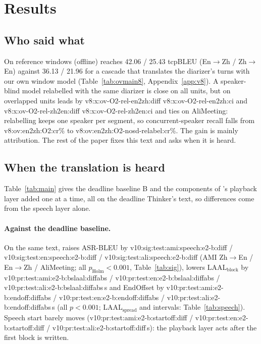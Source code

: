 \section{Results}
\label{sec:results}

\subsection{Who said what}
\label{sec:res-offline}
\label{sec:res-overlap}

On reference windows \sys{} (offline) reaches 42.06 / 25.43 tcpBLEU (En$\rightarrow$Zh / Zh$\rightarrow$En) against
36.13 / 21.96 for a cascade that translates the diarizer's turns with our own window model (Table~\ref{tab:ovmain8},
Appendix~\ref{app:v8}). A speaker-blind model relabelled with the same diarizer is close on all units, but on
overlapped units \sys{} leads by \num{v8:x:ov-O2-rel-en2zh:diff} \num{v8:x:ov-O2-rel-en2zh:ci} and
\num{v8:x:ov-O2-rel-zh2en:diff} \num{v8:x:ov-O2-rel-zh2en:ci} and ties on AliMeeting: relabelling keeps one speaker
per segment, so concurrent-speaker recall falls from \num{v8:ov:en2zh:O2:cr}\% to
\num{v8:ov:en2zh:O2-nosd-relabel:cr}\%. The gain is mainly attribution. The rest of the paper fixes this text and asks
when it is heard.

\subsection{When the translation is heard}
\label{sec:res-pa}
\label{sec:res-v10}

Table~\ref{tab:main} gives the deadline baseline B and the components of \sys{}'s playback layer added one at a time,
all on the deadline Thinker's text, so differences come from the speech layer alone.

\paragraph{Against the deadline baseline.} On the same text, \sys{} raises ASR-BLEU by
\num{v10:sig:test:ami:speech:e2-b:diff} / \num{v10:sig:test:en:speech:e2-b:diff} /
\num{v10:sig:test:ali:speech:e2-b:diff} (AMI Zh$\rightarrow$En / En$\rightarrow$Zh / AliMeeting; all
$p_\text{Holm}<0.001$, Table~\ref{tab:sig}), lowers LAAL$_\text{block}$ by
\num{v10:pr:test:ami:e2-b:bslaal:diffabs} / \num{v10:pr:test:en:e2-b:bslaal:diffabs} /
\num{v10:pr:test:ali:e2-b:bslaal:diffabs}\,s and EndOffset by \num{v10:pr:test:ami:e2-b:endoff:diffabs} /
\num{v10:pr:test:en:e2-b:endoff:diffabs} / \num{v10:pr:test:ali:e2-b:endoff:diffabs}\,s (all $p<0.001$;
LAAL$_\text{spread}$ and intervals: Table~\ref{tab:speech}). Speech start barely moves (\num{v10:pr:test:ami:e2-b:startoff:diff} /
\num{v10:pr:test:en:e2-b:startoff:diff} / \num{v10:pr:test:ali:e2-b:startoff:diff}\,s): the playback layer acts after
the first block is written.

